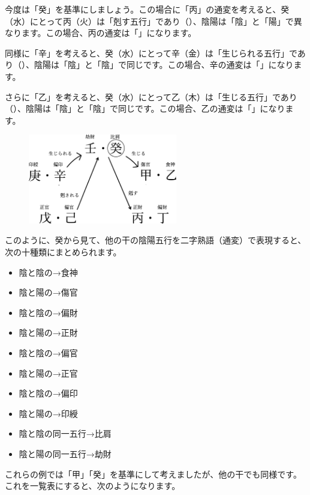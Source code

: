 \documentclass[a5paper,11pt,dvipdfmx]{tarticle}
\begin{document}
今度は「癸」を基準にしましょう。この場合に「丙」の通変を考えると、癸（水）にとって丙（火）は「剋す五行」であり（）、陰陽は「陰」と「陽」で異なります。この場合、丙の通変は「」になります。

同様に「辛」を考えると、癸（水）にとって辛（金）は「生じられる五行」であり（）、陰陽は「陰」と「陰」で同じです。この場合、辛の通変は「」になります。

さらに「乙」を考えると、癸（水）にとって乙（木）は「生じる五行」であり（）、陰陽は「陰」と「陰」で同じです。この場合、乙の通変は「」になります。

\begin{figure}
  \includegraphics[width=65mm,angle=90]{figs/figure5-5.eps}
\end{figure}

このように、癸から見て、他の干の陰陽五行を二字熟語（通変）で表現すると、次の十種類にまとめられます。

\begin{itemize}
\item 陰と陰の→食神
\item 陰と陽の→傷官
\item 陰と陰の→偏財
\item 陰と陽の→正財
\item 陰と陰の→偏官
\item 陰と陽の→正官
\item 陰と陰の→偏印
\item 陰と陽の→印綬
\item 陰と陰の同一五行→比肩
\item 陰と陽の同一五行→劫財
\end{itemize}

これらの例では「甲」「癸」を基準にして考えましたが、他の干でも同様です。これを一覧表にすると、次のようになります。
\end{document}
